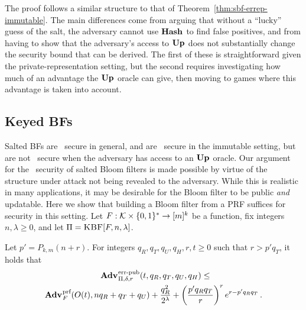 The proof follows a similar structure to that of
Theorem~\ref{thm:sbf-errep-immutable}. The main differences come from arguing
that without a ``lucky'' guess of the salt, the adversary cannot use $\textup{\textbf{Hash}}\hspace{0.5pt}$ to
find false positives, and from having to show that the adversary's access to
$\textup{\textbf{Up}}\hspace{0.5pt}$ does not substantially change the security bound that can be derived. The
first of these is straightforward given the private-representation setting, but
the second requires investigating how much of an advantage the $\textup{\textbf{Up}}\hspace{0.5pt}$ oracle can
give, then moving to games where this advantage is taken into account.



%  

\subsection{Keyed BFs}

Salted BFs are \erreps\ secure in general, and are \errep\ secure in the
immutable setting, but are not \errep\ secure when the adversary has access to
an $\textup{\textbf{Up}}\hspace{0.5pt}$ oracle. Our argument for the \erreps\ security of
salted Bloom filters is made possible by virtue of the structure under attack
not being revealed to the adversary. While this is realistic in many
applications, it may be desirable for the Bloom filter to be public \emph{and}
updatable.
%
Here we show that building a Bloom filter from a PRF suffices for security in
this setting.
%
Let $F:\mathcal{K}\times\{0,1\}^*\to[m]^k$ be a function, fix
integers~$n,\lambda\geq0$, and let $\Pi = \textnormal{\textsc{KBF}}[F,n,\lambda]$.

\begin{theorem}
\label{thm:bf-key-bound}
\label{thm:kbf-errep}
  Let $p' = P_{k,m}(n+r)$.  For integers $q_R, q_T, q_U, q_H, r, t \geq 0$ such that
  $r > p'q_T$, it holds that
  \begin{equation*}
    \begin{aligned}
      \Adv{\errep}_{\Pi,\delta,r}(t,\,&q_R,q_T,q_U,q_H) \leq \\
        \Adv{\prf}_F(O(t),nq_R+q_T+q_U) & +
      \frac{q_R^2}{2^\lambda} +
      \left(\frac{p'q_Rq_T}{r}\right)^re^{r-p'q_Rq_T} \,.
    \end{aligned}
  \end{equation*}
\end{theorem}

